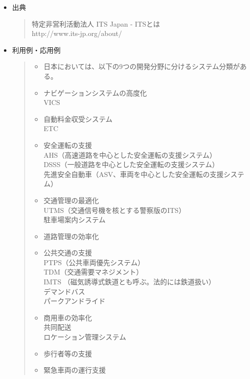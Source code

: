 \begin{itemize}
\begin{itemize}
\begin{quote}
    \end{quote}
  \item 出典\\
    \begin{quote}
      特定非営利活動法人 ITS Japan - ITSとは\\
      http://www.its-jp.org/about/\\
    \end{quote}
  \item 利用例・応用例\\
    \begin{quote}
      \begin{itemize}
      \item 日本においては、以下の9つの開発分野に分けるシステム分類がある。\\
      \item ナビゲーションシステムの高度化\\
        VICS\\
      \item 自動料金収受システム\\
        ETC\\
      \item 安全運転の支援\\
        AHS（高速道路を中心とした安全運転の支援システム）\\
        DSSS（一般道路を中心とした安全運転の支援システム）\\
        先進安全自動車（ASV、車両を中心とした安全運転の支援システム）\\
      \item 交通管理の最適化\\
        UTMS（交通信号機を核とする警察版のITS）\\
        駐車場案内システム\\
      \item 道路管理の効率化\\
      \item 公共交通の支援\\
        PTPS（公共車両優先システム）\\
        TDM（交通需要マネジメント）\\
        IMTS （磁気誘導式鉄道とも呼ぶ。法的には鉄道扱い）\\
        デマンドバス\\
        パークアンドライド\\
      \item 商用車の効率化\\
        共同配送\\
        ロケーション管理システム\\
      \item 歩行者等の支援\\
      \item 緊急車両の運行支援\\
      \end{itemize}
    \end{quote}
  \end{itemize}
\end{itemize}

